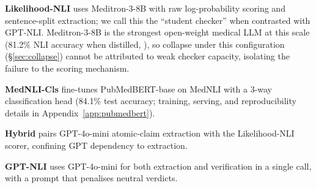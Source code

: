 \documentclass[11pt]{article}
\begin{document}
\textbf{Likelihood-NLI} uses Meditron-3-8B 
\citep{sallinen2025llama} with raw log-probability 
scoring and sentence-split extraction; we call this 
the ``student checker'' when contrasted with GPT-NLI. 
Meditron-3-8B is the strongest open-weight medical 
LLM at this scale (81.2\% NLI accuracy when 
distilled, \citealp{ji2026medragchecker}), so 
collapse under this configuration 
(\S\ref{sec:collapse}) cannot be attributed to weak 
checker capacity, isolating the failure to the 
scoring mechanism.

\textbf{MedNLI-Cls} fine-tunes PubMedBERT-base 
\citep{gu2021domain} on MedNLI 
\citep{romanov2018lessons} with a 3-way 
classification head (84.1\% test accuracy; training, 
serving, and reproducibility details in 
Appendix~\ref{app:pubmedbert}).

\textbf{Hybrid} pairs GPT-4o-mini atomic-claim 
extraction with the Likelihood-NLI scorer, confining 
GPT dependency to extraction.

\textbf{GPT-NLI} uses GPT-4o-mini for both 
extraction and verification in a single call, with 
a prompt that penalises neutral verdicts.


\end{document}
